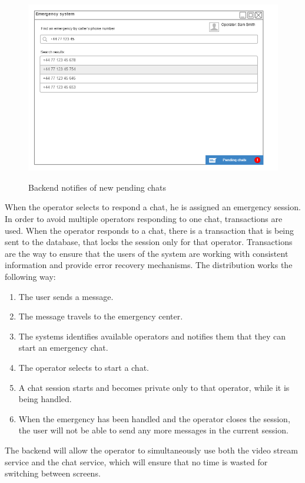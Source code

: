 \documentclass{article}
\begin{document}
	\begin{figure}[H]
		\centering
		\includegraphics[width=1\textwidth]{"ChatIteration1/chat_backend_search"}
		
		Backend notifies of new pending chats
	\end{figure}
When the operator selects to respond a chat, he is assigned an emergency session. In order to avoid multiple operators responding to one chat, transactions are used. When the operator responds to a chat, there is a transaction that is being sent to the database, that locks the session only for that operator. Transactions are the way to ensure that the users of the system are working with consistent information and provide error recovery mechanisms. The distribution works the following way: 
\begin{enumerate}
\item The user sends a message.
\item The message travels to the emergency center.
\item The systems identifies available operators and notifies them that they can start an emergency chat.
\item The operator selects to start a chat.
\item A chat session starts and becomes private only to that operator, while it is being handled.
\item When the emergency has been handled and the operator closes the session, the user will not be able to send any more messages in the current session.

\end{enumerate}
The backend will allow the operator to simultaneously use both the video stream service and the chat service, which will ensure that no time is wasted for switching between screens.
\end{document}
